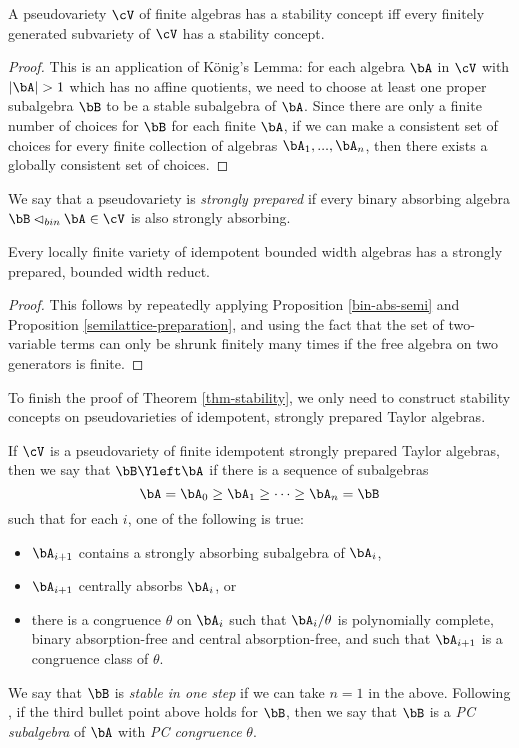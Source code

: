 \begin{prop} A pseudovariety $\cV$ of finite algebras has a stability concept iff every finitely generated subvariety of $\cV$ has a stability concept.
\end{prop}
\begin{proof} This is an application of K\"onig's Lemma: for each algebra $\bA$ in $\cV$ with $|\bA| > 1$ which has no affine quotients, we need to choose at least one proper subalgebra $\bB$ to be a stable subalgebra of $\bA$. Since there are only a finite number of choices for $\bB$ for each finite $\bA$, if we can make a consistent set of choices for every finite collection of algebras $\bA_1, ..., \bA_n$, then there exists a globally consistent set of choices.
\end{proof}

\begin{defn} We say that a pseudovariety is \emph{strongly prepared} if every binary absorbing algebra $\bB \lhd_{bin} \bA \in \cV$ is also strongly absorbing.
\end{defn}

\begin{prop} Every locally finite variety of idempotent bounded width algebras has a strongly prepared, bounded width reduct.
\end{prop}
\begin{proof} This follows by repeatedly applying Proposition \ref{bin-abs-semi} and Proposition \ref{semilattice-preparation}, and using the fact that the set of two-variable terms can only be shrunk finitely many times if the free algebra on two generators is finite.
\end{proof}

To finish the proof of Theorem \ref{thm-stability}, we only need to construct stability concepts on pseudovarieties of idempotent, strongly prepared Taylor algebras.

\begin{defn}\label{defn-strong-stable} If $\cV$ is a pseudovariety of finite idempotent strongly prepared Taylor algebras, then we say that $\bB \Yleft \bA$ if there is a sequence of subalgebras
\[
\bA = \bA_0 \ge \bA_1 \ge \cdots \ge \bA_n = \bB
\]
such that for each $i$, one of the following is true:
\begin{itemize}
\item $\bA_{i+1}$ contains a strongly absorbing subalgebra of $\bA_i$,
\item $\bA_{i+1}$ centrally absorbs $\bA_i$, or
\item there is a congruence $\theta$ on $\bA_i$ such that $\bA_i/\theta$ is polynomially complete, binary absorption-free and central absorption-free, and such that $\bA_{i+1}$ is a congruence class of $\theta$.
\end{itemize}
We say that $\bB$ is \emph{stable in one step} if we can take $n = 1$ in the above. Following \cite{zhuk-strong}, if the third bullet point above holds for $\bB$, then we say that $\bB$ is a \emph{PC subalgebra} of $\bA$ with \emph{PC congruence} $\theta$.
\end{defn}

